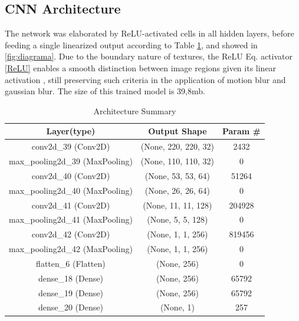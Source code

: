     \subsection{CNN Architecture}
    The network was elaborated by ReLU-activated cells in all hidden layers, before feeding a single linearized output according to Table \ref{tabela_sumario}, and showed in \ref{fig:diagrama}. 
    Due to the boundary nature of textures, the ReLU Eq. activator \ref{ReLU} enables a smooth distinction between image regions given its linear activation \cite{ArtigoRelu}, still preserving such criteria in the application of motion blur and gaussian blur.
    The size of this trained model is 39,8mb.
    
    \begin{table}[htbp]
    \caption{Architecture Summary}
        \begin{center}
            \begin{tabular}{|c|c|c|}
            \hline
            \textbf{Layer(type)} & \textbf{Output Shape} & \textbf{Param #} \\
            \hline
            conv2d\_39 (Conv2D) & (None, 220, 220, 32) & 2432 \\
            \hline
            max\_pooling2d\_39 (MaxPooling) & (None, 110, 110, 32) & 0\\
            \hline
            conv2d\_40 (Conv2D) & (None, 53, 53, 64) & 51264\\
            \hline
            max\_pooling2d\_40 (MaxPooling) & (None, 26, 26, 64) & 0\\
            \hline
            conv2d\_41 (Conv2D) & (None, 11, 11, 128) & 204928\\
            \hline
            max\_pooling2d\_41 (MaxPooling) & (None, 5, 5, 128) & 0\\
            \hline
            conv2d\_42 (Conv2D) & (None, 1, 1, 256) & 819456\\
            \hline
            max\_pooling2d\_42 (MaxPooling) & (None, 1, 1, 256) & 0\\
            \hline
            flatten\_6 (Flatten) & (None, 256) & 0\\
            \hline
            dense\_18 (Dense) & (None, 256) & 65792\\
            \hline
            dense\_19 (Dense) & (None, 256) & 65792\\
            \hline
            dense_20 (Dense) & (None, 1) & 257\\
            \hline
            \end{tabular}
        \label{tabela_sumario}
        \end{center}
    \end{table}
    
